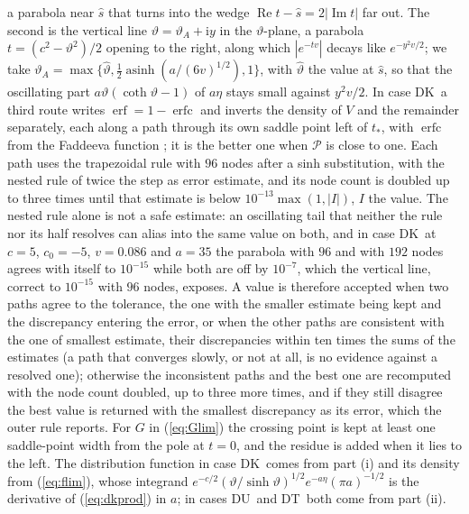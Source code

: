 \documentclass[ecta,nameyear,final,supplement]{econsocart}
\newcommand{\iu}{{\mathrm i}}
\newcommand{\Rea}{\operatorname{Re}}
\newcommand{\Ima}{\operatorname{Im}}
\newcommand{\erf}{\operatorname{erf}}
\newcommand{\erfc}{\operatorname{erfc}}
\newcommand{\Fk}{\textsf{\upshape DK}}
\newcommand{\Fu}{\textsf{\upshape DU}}
\newcommand{\Ft}{\textsf{\upshape DT}}
\newcommand{\cP}{\mathcal{P}}
\theoremstyle{plain}
\theoremstyle{definition}
\begin{document}
a parabola near $\hat s$ that turns into the wedge $\Rea t-\hat s=2|\Ima t|$ far out.  The second is the vertical line $\vartheta=\vartheta_A+\iu y$ in the $\vartheta$-plane, a parabola $t=(c^2-\vartheta^2)/2$ opening to the right, along which $|e^{-tv}|$ decays like $e^{-y^2v/2}$; we take $\vartheta_A=\max\{\hat\vartheta,\frac12\operatorname{asinh}(a/(6v)^{1/2}),1\}$, with $\hat\vartheta$ the value at $\hat s$, so that the oscillating part $a\vartheta(\coth\vartheta-1)$ of $a\eta$ stays small against $y^2v/2$.  In case \Fk\ a third route writes $\erf=1-\erfc$ and inverts the density of $V$ and the remainder separately, each along a path through its own saddle point left of $t_*$, with $\erfc$ from the Faddeeva function \citep{Weideman1994}; it is the better one when $\cP$ is close to one.  Each path uses the trapezoidal rule with $96$ nodes after a sinh substitution, with the nested rule of twice the step as error estimate, and its node count is doubled up to three times until that estimate is below $10^{-13}\max(1,|I|)$, $I$ the value.  The nested rule alone is not a safe estimate: an oscillating tail that neither the rule nor its half resolves can alias into the same value on both, and in case \Fk\ at $c=5$, $c_0=-5$, $v=0.086$ and $a=35$ the parabola with $96$ and with $192$ nodes agrees with itself to $10^{-15}$ while both are off by $10^{-7}$, which the vertical line, correct to $10^{-15}$ with $96$ nodes, exposes.  A value is therefore accepted when two paths agree to the tolerance, the one with the smaller estimate being kept and the discrepancy entering the error, or when the other paths are consistent with the one of smallest estimate, their discrepancies within ten times the sums of the estimates (a path that converges slowly, or not at all, is no evidence against a resolved one); otherwise the inconsistent paths and the best one are recomputed with the node count doubled, up to three more times, and if they still disagree the best value is returned with the smallest discrepancy as its error, which the outer rule reports.  For $G$ in (\ref{eq:Glim}) the crossing point is kept at least one saddle-point width from the pole at $t=0$, and the residue is added when it lies to the left.  The distribution function in case \Fk\ comes from part (i) and its density from (\ref{eq:flim}), whose integrand $e^{-c/2}(\vartheta/\sinh\vartheta)^{1/2}e^{-a\eta}(\pi a)^{-1/2}$ is the derivative of (\ref{eq:dkprod}) in $a$; in cases \Fu\ and \Ft\ both come from part (ii).
\end{document}

